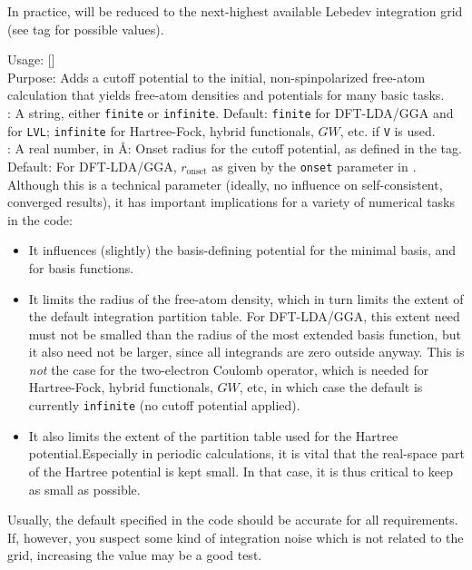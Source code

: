 In practice,  will be reduced to the next-highest
available Lebedev integration grid (see
 tag for possible values). 

{
  \noindent
  Usage:   []
    \\[1.0ex]
  Purpose: Adds a cutoff potential to the initial, non-spinpolarized
    free-atom calculation that yields free-atom densities and
    potentials for many basic tasks.\\[1.0ex]
   : A string, either \texttt{finite} or
    \texttt{infinite}. Default: \texttt{finite} for DFT-LDA/GGA and
      for  \texttt{LVL};
    \texttt{infinite} for Hartree-Fock, hybrid functionals, $GW$, etc. 
      if  \texttt{V} is used.\\
   : A real number, in {\AA}: Onset radius for the
    cutoff potential, as defined in the 
    tag. Default: For DFT-LDA/GGA, $r_\text{onset}$ as given by the
    \texttt{onset} parameter in  .\\
}
Although this is a technical parameter (ideally, no influence on
self-consistent, converged results), it has important implications for
a variety of numerical tasks in the code:
\begin{itemize}
  \item It influences (slightly) the basis-defining potential for the
    minimal basis, and for  basis
    functions.
  \item It limits the radius of the free-atom density, which in turn
    limits the extent of the default integration partition table. For
    DFT-LDA/GGA, this extent need must not be smalled than the radius
    of the most extended basis function, but it also need not be
    larger, since all integrands are zero outside anyway. This is
    \emph{not} the case for the two-electron Coulomb operator, which
    is needed for Hartree-Fock, hybrid functionals, $GW$, etc, in
    which case the default is currently \texttt{infinite} (no cutoff
    potential applied).
  \item It also limits the extent of the partition table used for the
    Hartree potential.Especially in periodic calculations, it is vital
    that the real-space part of the Hartree potential is kept
    small. In that case, it is thus critical to keep 
    as small as possible.
\end{itemize}
Usually, the default specified in the code should be accurate for all
requirements. If, however, you suspect some kind of integration noise
which is not related to the grid, increasing the
 value may be a good test. 

